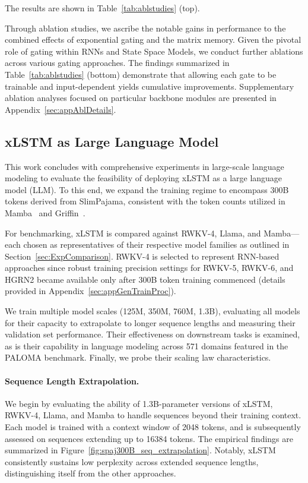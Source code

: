 The results are shown in Table~\ref{tab:ablstudies} (top). 

Through ablation studies, we ascribe the notable gains in performance to the combined effects of exponential gating and the matrix memory. Given the pivotal role of gating within RNNs and State Space Models, we conduct further ablations across various gating approaches. The findings summarized in Table~\ref{tab:ablstudies} (bottom) demonstrate that allowing each gate to be trainable and input-dependent yields cumulative improvements. Supplementary ablation analyses focused on particular backbone modules are presented in Appendix~\ref{sec:appAblDetails}.

\subsection{xLSTM as Large Language Model}
\label{sec:ExpLanguage}

This work concludes with comprehensive experiments in large-scale language modeling to evaluate the feasibility of deploying xLSTM as a large language model (LLM). To this end, we expand the training regime to encompass 300B tokens derived from SlimPajama, consistent with the token counts utilized in Mamba~\citep{Gu:24arxiv} and Griffin~\citep{De:24arxiv}.

For benchmarking, xLSTM is compared against RWKV-4, Llama, and Mamba—each chosen as representatives of their respective model families as outlined in Section~\ref{sec:ExpComparison}. RWKV-4 is selected to represent RNN-based approaches since robust training precision settings for RWKV-5, RWKV-6, and HGRN2 became available only after 300B token training commenced (details provided in Appendix~\ref{sec:appGenTrainProc}).

We train multiple model scales (125M, 350M, 760M, 1.3B), evaluating all models for their capacity to extrapolate to longer sequence lengths and measuring their validation set performance. Their effectiveness on downstream tasks is examined, as is their capability in language modeling across 571 domains featured in the PALOMA benchmark. Finally, we probe their scaling law characteristics.

\paragraph{Sequence Length Extrapolation.}
\label{sec:spaj300B_ctx_extrapolation}
We begin by evaluating the ability of 1.3B-parameter versions of xLSTM, RWKV-4, Llama, and Mamba to handle sequences beyond their training context. Each model is trained with a context window of 2048 tokens, and is subsequently assessed on sequences extending up to 16384 tokens. The empirical findings are summarized in Figure~\ref{fig:spaj300B_seq_extrapolation}. Notably, xLSTM consistently sustains low perplexity across extended sequence lengths, distinguishing itself from the other approaches.

